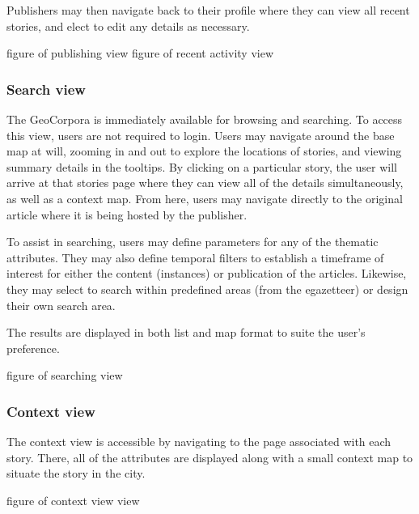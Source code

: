 Publishers may then navigate back to their profile where they can view all recent stories, and elect to edit any details as necessary.

{\color{red}figure of publishing view}
{\color{red}figure of recent activity view}

\subsubsection{Search view}
The GeoCorpora is immediately available for browsing and searching. To access this view, users are not required to login. Users may navigate around the base map at will, zooming in and out to explore the locations of stories, and viewing summary details in the tooltips.  By clicking on a particular story, the user will arrive at that stories page where they can view all of the details simultaneously, as well as a context map. From here, users may navigate directly to the original article where it is being hosted by the publisher.

To assist in searching, users may define parameters for any of the thematic attributes. They may also define temporal filters to establish a timeframe of interest for either the content (instances) or publication of the articles. Likewise, they may select to search within predefined areas (from the egazetteer) or design their own search area.

The results are displayed in both list and map format to suite the user's preference.

{\color{red}figure of searching view}


\subsubsection{Context view}
The context view is accessible by navigating to the page associated with each story. There, all of the attributes are displayed along with a small context map to situate the story in the city.


{\color{red}figure of context view view}



%

